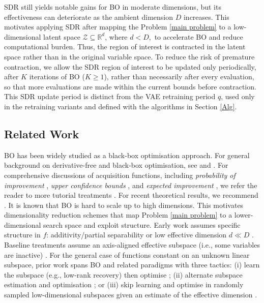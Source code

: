 \documentclass[pdflatex,sn-mathphys-num]{sn-jnl}%
\theoremstyle{thmstyleone}%
\theoremstyle{thmstyletwo}%
\theoremstyle{thmstylethree}%
\begin{document}
SDR still yields notable gains for BO in moderate dimensions,  but its effectiveness can deteriorate as the ambient dimension $D$ increases. This motivates applying SDR after mapping the Problem \eqref{main problem} to a low-dimensional latent space $\mathcal{Z} \subseteq \mathbb{R}^d$, where $d < D,$ to accelerate BO and reduce computational burden. Thus, the region of interest is contracted in the latent space rather than in the original variable space. To reduce the risk of premature contraction, we allow the SDR region of interest to be updated only periodically, after $K$ iterations of BO ($K \geq 1$), rather than necessarily after every evaluation, so that more evaluations are made within the current bounds before contraction. This SDR update period is distinct from the VAE retraining period $q$, used only in the retraining variants and defined with the algorithms in Section \ref{Alg}.


\subsection{Related Work}
BO has been widely studied as a black-box optimisation approach. For general background on derivative-free and black-box optimisation, see \cite{audet2026derivativefree, AudetHare2017} and \cite{Conn2009}. For comprehensive discussions of acquisition functions, including \textit{probability of improvement} \cite{Kushner1964}, \textit{upper confidence bounds} \cite{Cox1997}, and \textit{expected improvement} \cite{Mockus1978}, we refer the reader to more tutorial treatments \cite{Shahriari2016, Frazier2018, Rasmussen2006}. For recent theoretical results, we recommend \cite{srinivas2010ucb, bull2011ego, pmlr-v77-nguyen17a, teckentrup2020convergencegaussianprocessregression}. It is known that BO is hard to scale up to high dimensions. This motivates dimensionality reduction schemes that map Problem \eqref{main problem} to a lower-dimensional search space and exploit structure. Early work assumes specific structure in \(f\): additivity/partial separability \cite{kandasamy2015additive,Rolland2018} or low effective dimension \(d\ll D\) \cite{Wang2013,constantine2015active,fornasier2012learningmutliridge}. Baseline treatments assume an axis-aligned effective subspace (i.e., some variables are inactive) \cite{bensalem2019sequential, chen2012joint}. For the general case of functions constant on an unknown linear subspace, prior work spans BO and related paradigms with three tactics: (i) learn the subspace (e.g., low-rank recovery) then optimise \cite{djolonga2013highdimgpbandits, tyagi2014learning}; (ii) alternate subspace estimation and optimisation \cite{garnett2013activelearninglinearembeddings, cartis2021globaloptimizationusingrandom}; or (iii) skip learning and optimise in randomly sampled low-dimensional subspaces given an estimate of the effective dimension \cite{binois2020choice, Wang2013}.\\
\end{document}
